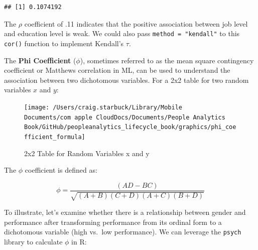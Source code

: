 \documentclass[]{book}
\newenvironment{Shaded}{\begin{snugshade}}{\end{snugshade}}
\newcommand{\CommentTok}[1]{\textcolor[rgb]{0.56,0.35,0.01}{\textit{#1}}}
\newcommand{\DecValTok}[1]{\textcolor[rgb]{0.00,0.00,0.81}{#1}}
\newcommand{\KeywordTok}[1]{\textcolor[rgb]{0.13,0.29,0.53}{\textbf{#1}}}
\newcommand{\NormalTok}[1]{#1}
\newcommand{\OperatorTok}[1]{\textcolor[rgb]{0.81,0.36,0.00}{\textbf{#1}}}
\newcommand{\StringTok}[1]{\textcolor[rgb]{0.31,0.60,0.02}{#1}}
\begin{document}
\begin{verbatim}
## [1] 0.1074192
\end{verbatim}

The \(\rho\) coefficient of .11 indicates that the positive association between job level and education level is weak. We could also pass \texttt{method\ =\ "kendall"} to this \texttt{cor()} function to implement Kendall's \(\tau\).

The \textbf{Phi Coefficient} (\(\phi\)), sometimes referred to as the mean square contingency coefficient or Matthews correlation in ML, can be used to understand the association between two dichotomous variables. For a 2x2 table for two random variables \(x\) and \(y\):

\begin{figure}

{\centering \texttt{[image: /Users/craig.starbuck/Library/Mobile Documents/com~apple~CloudDocs/Documents/People Analytics Book/GitHub/peopleanalytics\_lifecycle\_book/graphics/phi\_coefficient\_formula]} 

}

\caption{2x2 Table for Random Variables x and y}\label{fig:phi-tbl}
\end{figure}

The \(\phi\) coefficient is defined as:

\[ \phi = {\frac {(AD-BC)}{\sqrt{(A+B)(C+D)(A+C)(B+D)}}} \]

To illustrate, let's examine whether there is a relationship between gender and performance after transforming performance from its ordinal form to a dichotomous variable (high vs.~low performance). We can leverage the \texttt{psych} library to calculate \(\phi\) in R:

\begin{Shaded}
\end{Shaded}
\end{document}
